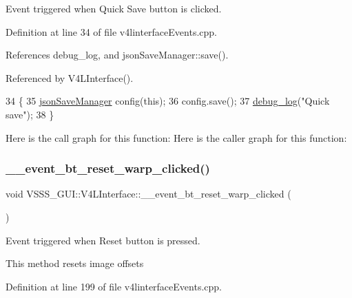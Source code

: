 Event triggered when \textquotesingle{}Quick Save\textquotesingle{} button is clicked. 



Definition at line 34 of file v4linterface\+Events.\+cpp.



References debug\+\_\+log, and json\+Save\+Manager\+::save().



Referenced by V4\+L\+Interface().


\begin{DoxyCode}
34                                                      \{
35         \hyperlink{classjson_save_manager}{jsonSaveManager} config(\textcolor{keyword}{this});
36         config.save();
37         \hyperlink{debug_8hpp_afde3f42696113719c9ae35507125ee6e}{debug\_log}(\textcolor{stringliteral}{"Quick save"});
38     \}
\end{DoxyCode}
Here is the call graph for this function\+:
Here is the caller graph for this function\+:
\mbox{\label{class_v_s_s_s___g_u_i_1_1_v4_l_interface_a0d852b1969af63e56f6d3efceb4604ff}} 
\subsubsection{\texorpdfstring{\+\_\+\+\_\+event\+\_\+bt\+\_\+reset\+\_\+warp\+\_\+clicked()}{\_\_event\_bt\_reset\_warp\_clicked()}}
{\footnotesize\ttfamily void V\+S\+S\+S\+\_\+\+G\+U\+I\+::\+V4\+L\+Interface\+::\+\_\+\+\_\+event\+\_\+bt\+\_\+reset\+\_\+warp\+\_\+clicked (\begin{DoxyParamCaption}{ }\end{DoxyParamCaption})}



Event triggered when \textquotesingle{}Reset\textquotesingle{} button is pressed. 

This method resets image offsets 

Definition at line 199 of file v4linterface\+Events.\+cpp.



